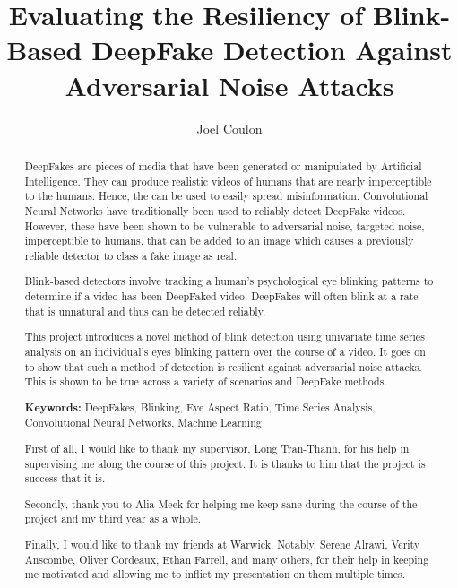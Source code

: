 \documentclass[a4paper]{report}
\author{Joel Coulon}
\title{Evaluating the Resiliency of Blink-Based DeepFake Detection Against Adversarial Noise Attacks}
\begin{document}


\pagestyle{plain}

\begin{abstract}
DeepFakes are pieces of media that have been generated or manipulated by Artificial Intelligence. They can produce realistic videos of humans that are nearly imperceptible to the humans. Hence, the can be used to easily spread misinformation. Convolutional Neural Networks have traditionally been used to reliably detect DeepFake videos. However, these have been shown to be vulnerable to adversarial noise, targeted noise, imperceptible to humans, that can be added to an image which causes a previously reliable detector to class a fake image as real.

Blink-based detectors involve tracking a human's psychological eye blinking patterns to determine if a video has been DeepFaked video. DeepFakes will often blink at a rate that is unnatural and thus can be detected reliably.

This project introduces a novel method of blink detection using univariate time series analysis on an individual's eyes blinking pattern over the course of a video. It goes on to show that such a method of detection is resilient against adversarial noise attacks. This is shown to be true across a variety of scenarios and DeepFake methods.

\textbf{Keywords:} DeepFakes, Blinking, Eye Aspect Ratio, Time Series Analysis, Convolutional Neural Networks, Machine Learning
\end{abstract}

\renewcommand{\abstractname}{Acknowledgements}
\begin{abstract}
First of all, I would like to thank my supervisor, Long Tran-Thanh, for his help in supervising me along the course of this project. It is thanks to him that the project is success that it is.

Secondly, thank you to Alia Meek for helping me keep sane during the course of the project and my third year as a whole.

Finally, I would like to thank my friends at Warwick. Notably, Serene Alrawi, Verity Anscombe, Oliver Cordeaux, Ethan Farrell, and many others, for their help in keeping me motivated and allowing me to inflict my presentation on them multiple times.
\end{abstract}

\tableofcontents
\listoffigures
{}
\listofalgorithms
{}
\listoftables
{}
\newpage








\printbibliography

\appendix

\end{document}
